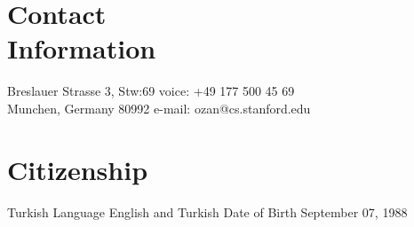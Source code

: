\documentclass[margin,line,10pt]{resume}
\begin{document}
\begin{resume}

    \section{\mysidestyle \textcolor{olgray}{Contact\\Information}}
    Breslauer Strasse 3, Stw:69        \hfill voice: +49 177 500 45 69          \vspace{0mm}\\\vspace{0mm}%
    Munchen, Germany 80992 \hfill e-mail: ozan@cs.stanford.edu \vspace{0mm}\\\vspace{0mm}%



%
%
%


\section{\mysidestyle \textcolor{olgray}{Citizenship}} Turkish \hspace{13.9mm} {\mysidestyle \textcolor{olgray}{Language}} \hspace{3.56mm} English and Turkish \hfill {\mysidestyle \textcolor{olgray}{Date of Birth}}  \hspace{3.56mm} September 07, 1988

\end{resume}
\end{document}
